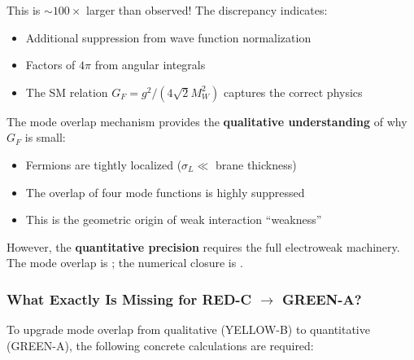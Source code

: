 This is $\sim 100\times$ larger than observed! The discrepancy indicates:
\begin{itemize}[nosep]
    \item Additional suppression from wave function normalization
    \item Factors of $4\pi$ from angular integrals
    \item The SM relation $G_F = g^2/(4\sqrt{2}M_W^2)$ captures the correct physics
\end{itemize}

\begin{tcolorbox}[colback=yellow!5, colframe=orange!60!black,
    title=\textbf{Honest Assessment: Mode Overlap Status (YELLOW-B)}]
The mode overlap mechanism provides the \textbf{qualitative understanding}
of why $G_F$ is small:
\begin{itemize}[nosep]
    \item Fermions are tightly localized ($\sigma_L \ll$ brane thickness)
    \item The overlap of four mode functions is highly suppressed
    \item This is the geometric origin of weak interaction ``weakness''
\end{itemize}

However, the \textbf{quantitative precision} requires the full electroweak
machinery. The mode overlap is \tagP{}; the numerical closure is \tagDc{}.
\end{tcolorbox}

\subsubsection{What Exactly Is Missing for RED-C $\to$ GREEN-A?}

To upgrade mode overlap from qualitative (YELLOW-B) to quantitative (GREEN-A),
the following concrete calculations are required:

